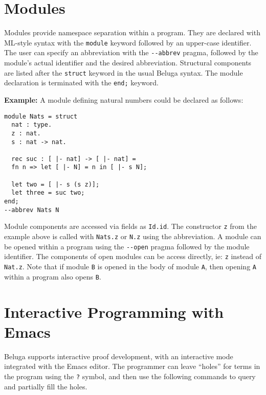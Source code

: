 \documentclass[11pt]{article}
\begin{document}


\section{Modules}
Modules provide namespace separation within a program.
They are declared with ML-style syntax with the \verb+module+ keyword followed by an upper-case identifier.
The user can specify an abbreviation with the \verb+--abbrev+ pragma, followed by the module's actual identifier and the desired abbreviation.
Structural components are listed after the \verb+struct+ keyword in the usual Beluga syntax.
The module declaration is terminated with the \verb+end;+ keyword.

\textbf{Example:} A module defining natural numbers could be declared as follows:
\begin{verbatim}
module Nats = struct
  nat : type.
  z : nat.
  s : nat -> nat.

  rec suc : [ |- nat] -> [ |- nat] =
  fn n => let [ |- N] = n in [ |- s N];

  let two = [ |- s (s z)];
  let three = suc two;
end;
--abbrev Nats N
\end{verbatim}

Module components are accessed via fields as \verb+Id.id+.
The constructor \verb+z+ from the example above is called with \verb+Nats.z+ or \verb+N.z+ using the abbreviation.
A module can be opened within a program using the \verb+--open+ pragma followed by the module identifier.
The components of open modules can be access directly, ie: \verb+z+ instead of \verb+Nat.z+.
Note that if module \verb+B+ is opened in the body of module \verb+A+, then opening \verb+A+ within a program also opens \verb+B+.


\section{Interactive Programming with Emacs}
Beluga supports interactive proof development, with an interactive mode integrated with the Emacs editor.
The programmer can leave ``holes'' for terms in the program using the \verb+?+ symbol, and then use the following commands to query and partially fill the holes.
\end{document}
